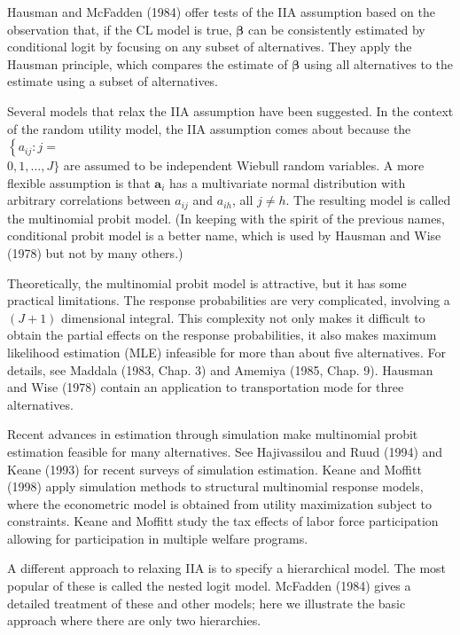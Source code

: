 \documentclass[10pt]{article}
\begin{document}
Hausman and McFadden (1984) offer tests of the IIA assumption based on the observation that, if the CL model is true, $\boldsymbol{\beta}$ can be consistently estimated by conditional logit by focusing on any subset of alternatives. They apply the Hausman principle, which compares the estimate of $\boldsymbol{\beta}$ using all alternatives to the estimate using a subset of alternatives.

Several models that relax the IIA assumption have been suggested. In the context of the random utility model, the IIA assumption comes about because the $\left\{a_{i j}: j=\right.$\\
$0,1, \ldots, J\}$ are assumed to be independent Wiebull random variables. A more flexible assumption is that $\mathbf{a}_{i}$ has a multivariate normal distribution with arbitrary correlations between $a_{i j}$ and $a_{i h}$, all $j \neq h$. The resulting model is called the multinomial probit model. (In keeping with the spirit of the previous names, conditional probit model is a better name, which is used by Hausman and Wise (1978) but not by many others.)

Theoretically, the multinomial probit model is attractive, but it has some practical limitations. The response probabilities are very complicated, involving a $(J+1)$ dimensional integral. This complexity not only makes it difficult to obtain the partial effects on the response probabilities, it also makes maximum likelihood estimation (MLE) infeasible for more than about five alternatives. For details, see Maddala (1983, Chap. 3) and Amemiya (1985, Chap. 9). Hausman and Wise (1978) contain an application to transportation mode for three alternatives.

Recent advances in estimation through simulation make multinomial probit estimation feasible for many alternatives. See Hajivassilou and Ruud (1994) and Keane (1993) for recent surveys of simulation estimation. Keane and Moffitt (1998) apply simulation methods to structural multinomial response models, where the econometric model is obtained from utility maximization subject to constraints. Keane and Moffitt study the tax effects of labor force participation allowing for participation in multiple welfare programs.

A different approach to relaxing IIA is to specify a hierarchical model. The most popular of these is called the nested logit model. McFadden (1984) gives a detailed treatment of these and other models; here we illustrate the basic approach where there are only two hierarchies.
\end{document}
